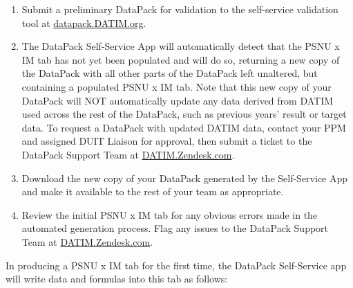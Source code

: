 \documentclass[
  openany]{book}
\begin{document}
\begin{enumerate}
\def\labelenumi{\arabic{enumi})}
\item
  Submit a preliminary DataPack for validation to the self-service
  validation tool at \href{http://datapack.datim.org/}{datapack.DATIM.org}.
\item
  The DataPack Self-Service App will automatically detect that the
  PSNU x IM tab has not yet been populated and will do so, returning a
  new copy of the DataPack with all other parts of the DataPack left
  unaltered, but containing a populated PSNU x IM tab. Note that this
  new copy of your DataPack will NOT automatically update any data
  derived from DATIM used across the rest of the DataPack, such as
  previous years' result or target data. To request a DataPack with
  updated DATIM data, contact your PPM and assigned DUIT Liaison for
  approval, then submit a ticket to the DataPack Support Team at
  \href{http://datim.zendesk.com/}{DATIM.Zendesk.com}.
\item
  Download the new copy of your DataPack generated by the Self-Service
  App and make it available to the rest of your team as appropriate.
\item
  Review the initial PSNU x IM tab for any obvious errors made in the
  automated generation process. Flag any issues to the DataPack
  Support Team at \href{http://datim.zendesk.com/}{DATIM.Zendesk.com}.
\end{enumerate}

In producing a PSNU x IM tab for the first time, the DataPack
Self-Service app will write data and formulas into this tab as follows:
\end{document}
